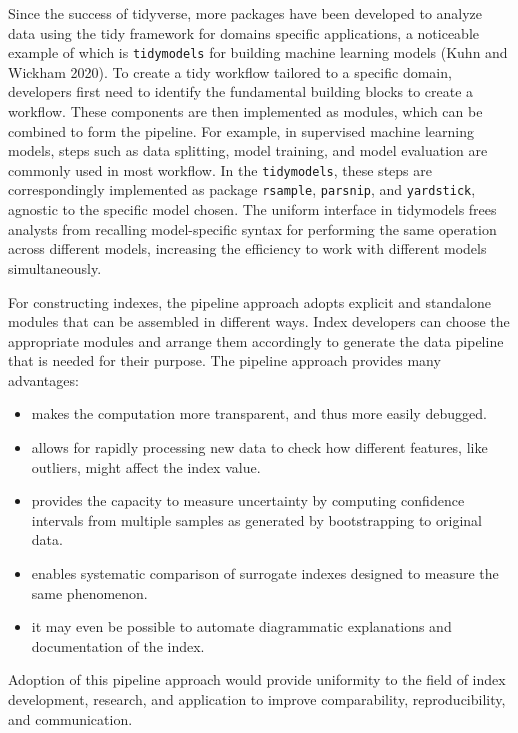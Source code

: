 \documentclass[
]{interact}
\providecommand{\tightlist}{%
  \setlength{\itemsep}{0pt}\setlength{\parskip}{0pt}}\usepackage{longtable,booktabs,array}
\begin{document}
Since the success of tidyverse, more packages have been developed to
analyze data using the tidy framework for domains specific applications,
a noticeable example of which is \texttt{tidymodels} for building
machine learning models (Kuhn and Wickham 2020). To create a tidy
workflow tailored to a specific domain, developers first need to
identify the fundamental building blocks to create a workflow. These
components are then implemented as modules, which can be combined to
form the pipeline. For example, in supervised machine learning models,
steps such as data splitting, model training, and model evaluation are
commonly used in most workflow. In the \texttt{tidymodels}, these steps
are correspondingly implemented as package \texttt{rsample},
\texttt{parsnip}, and \texttt{yardstick}, agnostic to the specific model
chosen. The uniform interface in tidymodels frees analysts from
recalling model-specific syntax for performing the same operation across
different models, increasing the efficiency to work with different
models simultaneously.

For constructing indexes, the pipeline approach adopts explicit and
standalone modules that can be assembled in different ways. Index
developers can choose the appropriate modules and arrange them
accordingly to generate the data pipeline that is needed for their
purpose. The pipeline approach provides many advantages:

\begin{itemize}
\tightlist
\item
  makes the computation more transparent, and thus more easily debugged.
\item
  allows for rapidly processing new data to check how different
  features, like outliers, might affect the index value.
\item
  provides the capacity to measure uncertainty by computing confidence
  intervals from multiple samples as generated by bootstrapping to
  original data.
\item
  enables systematic comparison of surrogate indexes designed to measure
  the same phenomenon.
\item
  it may even be possible to automate diagrammatic explanations and
  documentation of the index.
\end{itemize}

Adoption of this pipeline approach would provide uniformity to the field
of index development, research, and application to improve
comparability, reproducibility, and communication.
\end{document}
